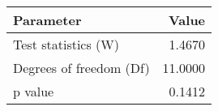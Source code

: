 \begin{tabular}{lr}
\toprule
               Parameter &    Value \\
\midrule
     Test statistics (W) &   1.4670 \\
 Degrees of freedom (Df) &  11.0000 \\
                 p value &   0.1412 \\
\bottomrule
\end{tabular}
